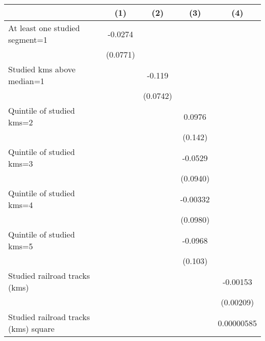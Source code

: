 {
\def\sym#1{\ifmmode^{#1}\else\(^{#1}\)\fi}
\begin{tabular}{l*{4}{c}}
\hline\hline
                    &\multicolumn{1}{c}{(1)}         &\multicolumn{1}{c}{(2)}         &\multicolumn{1}{c}{(3)}         &\multicolumn{1}{c}{(4)}         \\
\hline
At least one studied segment=1&     -0.0274         &                     &                     &                     \\
                    &    (0.0771)         &                     &                     &                     \\
[1em]
Studied kms above median=1&                     &      -0.119         &                     &                     \\
                    &                     &    (0.0742)         &                     &                     \\
[1em]
Quintile of studied kms=2&                     &                     &      0.0976         &                     \\
                    &                     &                     &     (0.142)         &                     \\
[1em]
Quintile of studied kms=3&                     &                     &     -0.0529         &                     \\
                    &                     &                     &    (0.0940)         &                     \\
[1em]
Quintile of studied kms=4&                     &                     &    -0.00332         &                     \\
                    &                     &                     &    (0.0980)         &                     \\
[1em]
Quintile of studied kms=5&                     &                     &     -0.0968         &                     \\
                    &                     &                     &     (0.103)         &                     \\
[1em]
Studied railroad tracks (kms)&                     &                     &                     &    -0.00153         \\
                    &                     &                     &                     &   (0.00209)         \\
[1em]
Studied railroad tracks (kms) square&                     &                     &                     &  0.00000585         \\

\end{tabular}}
